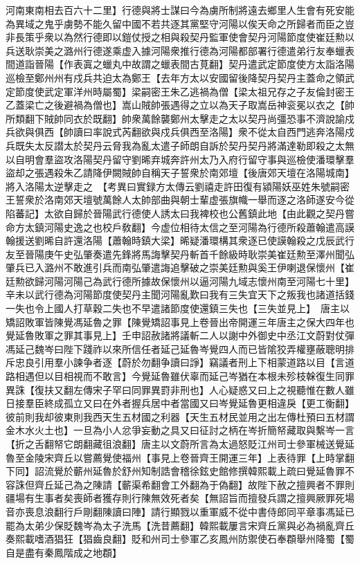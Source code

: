 河南東南相去百六十二里】行德與將士謀曰今為虜所制將遠去鄉里人生會有死安能為異域之鬼乎虜勢不能久留中國不若共逐其黨堅守河陽以俟天命之所歸者而臣之豈非長策乎衆以為然行德即以鎧仗授之相與殺契丹監軍使會契丹河陽節度使崔廷勲以兵送耿崇美之潞州行德遂乘虚入據河陽衆推行德為河陽都部署行德遣弟行友奉蠟表間道詣晉陽【作表寘之蠟丸中故謂之蠟表間古莧翻】契丹遣武定節度使方太詣洛陽巡檢至鄭州州有戍兵共迫太為鄭王【去年方太以安國留後降契丹契丹主蓋命之領武定節度使武定軍洋州時屬蜀】梁嗣密王朱乙逃禍為僧【梁太祖兄存之子友倫封密王乙蓋梁亡之後避禍為僧也】嵩山賊帥張遇得之立以為天子取嵩岳神衮冕以衣之【帥所類翻下賊帥同衣於既翻】帥衆萬餘襲鄭州太擊走之太以契丹尚彊恐事不濟說諭戍兵欲與俱西【帥讀曰率說式芮翻欲與戍兵俱西至洛陽】衆不從太自西門逃奔洛陽戍兵既失太反譛太於契丹云脅我為亂太遣子師朗自訴於契丹契丹將滿達勒即殺之太無以自明會羣盜攻洛陽契丹留守劉晞弃城奔許州太乃入府行留守事與巡檢使潘環擊羣盜却之張遇殺朱乙請降伊闕賊帥自稱天子誓衆於南郊壇【後唐郊天壇在洛陽城南】將入洛陽太逆擊走之　【考異曰實録方太傳云劉禧走許田復有潁陽妖巫姓朱號嗣密王誓衆於洛南郊天壇號萬餘人太帥部曲與朝士輩虚張旗幟一舉而逐之洛師遂安今從陷蕃記】太欲自歸於晉陽武行德使人誘太曰我裨校也公舊鎮此地【由此觀之契丹嘗命方太鎮河陽史逸之也校戶敎翻】今虚位相待太信之至河陽為行德所殺蕭翰遣高謨翰援送劉晞自許還洛陽【蕭翰時鎮大梁】晞疑潘環構其衆逐已使謨翰殺之戊辰武行友至晉陽庚午史弘肇奏遣先鋒將馬誨擊契丹斬首千餘級時耿崇美崔廷勲至澤州聞弘肇兵已入潞州不敢進引兵而南弘肇遣誨追擊破之崇美廷勲與奚王伊喇退保懷州【崔廷勲欲歸河陽河陽己為武行德所據故保懷州以逼河陽九域志懷州南至河陽七十里】辛未以武行德為河陽節度使契丹主聞河陽亂歎曰我有三失宜天下之叛我也諸道括錢一失也令上國人打草穀二失也不早遣諸節度使還鎮三失也【三失並見上】　唐主以矯詔敗軍皆陳覺馮延魯之罪【陳覺矯詔事見上卷晉出帝開運三年唐主之保大四年也覺延魯敗軍之罪其事見上】壬申詔赦諸將議斬二人以謝中外御史中丞江文蔚對仗彈馮延己魏岑曰陛下踐祚以來所信任者延己延魯岑覺四人而已皆隂狡弄權壅蔽聰明排斥忠良引用羣小諫争者逐【蔚於勿翻争讀曰諍】竊議者刑上下相蒙道路以目【言道路相遇但以目相視而不敢言】今覺延魯雖伏辜而延己岑猶在本根未殄枝榦復生同罪異誅【復扶又翻左傳宋子罕曰同罪異罸非刑也】人心疑惑又曰上之視聽惟在數人雖日接羣臣終成孤立又曰在外者握兵居中者當國又曰岑覺延魯更相違戾【更工衡翻】彼前則我却彼東則我西天生五材國之利器【天生五材民並用之出左傳杜預曰五材謂金木水火土也】一旦為小人忿爭妄動之具又曰征討之柄在岑折簡帑藏取與繫岑一言【折之舌翻帑它朗翻藏徂浪翻】唐主以文蔚所言為太過怒貶江州司士參軍械送覺延魯至金陵宋齊丘以嘗薦覺使福州【事見上卷晉齊王開運三年】上表待罪【上時掌翻下同】詔流覺於蘄州延魯於舒州知制誥會稽徐鉉史館修撰韓熙載上疏曰覺延魯罪不容誅但齊丘延己為之陳請【蘄渠希翻會工外翻為于偽翻】故陛下赦之擅興者不罪則疆場有生事者矣喪師者獲存則行陳無效死者矣【無詔旨而擅發兵謂之擅興厥罪死場音亦喪息浪翻行戶剛翻陳讀曰陣】請行顯戮以重軍威不從中書侍郎同平章事馮延已罷為太弟少保貶魏岑為太子洗馬【洗昔薦翻】韓熙載屢言宋齊丘黨與必為禍亂齊丘奏熙載嗜酒猖狂【猖齒良翻】貶和州司士參軍乙亥鳳州防禦使石奉頵舉州降蜀【蜀自是盡有秦鳳階成之地頵】

